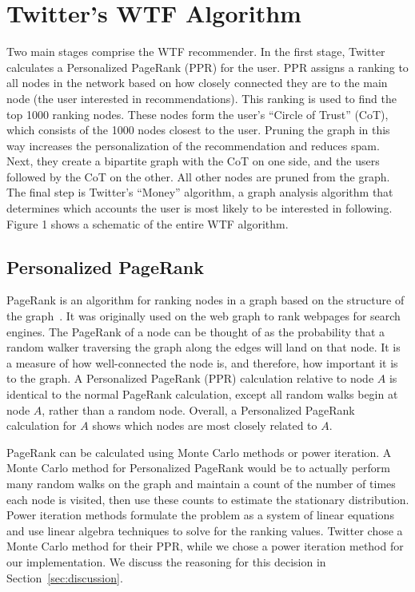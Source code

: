 \documentclass{article}
\renewcommand{\cite}[1]{}
\begin{document}
\section{Twitter's WTF Algorithm}

Two main stages comprise the WTF recommender. In the first stage, Twitter
calculates a Personalized PageRank (PPR) for the user. PPR assigns a
ranking to all nodes in the network based on how closely connected they are
to the main node (the user interested in recommendations). This ranking is
used to find the top 1000 ranking nodes. These nodes form the user's
``Circle of Trust'' (CoT), which consists of the 1000 nodes closest to the
user. Pruning the graph in this way increases the personalization of the
recommendation and reduces spam. Next, they create a bipartite graph with
the CoT on one side, and the users followed by the CoT on the other. All
other nodes are pruned from the graph. The final step is Twitter's
``Money'' algorithm, a graph analysis algorithm that determines which
accounts the user is most likely to be interested in following. Figure 1
shows a schematic of the entire WTF algorithm.

\subsection{Personalized PageRank}
PageRank is an algorithm for ranking nodes in a graph based on the
structure of the graph~\cite{Page:1999:TPC}. It was originally used on the
web graph to rank webpages for search engines. The PageRank of a node can
be thought of as the probability that a random walker traversing the graph
along the edges will land on that node. It is a measure of how
well-connected the node is, and therefore, how important it is to the
graph. A Personalized PageRank (PPR) calculation relative to node $A$ is
identical to the normal PageRank calculation, except all random walks begin
at node $A$, rather than a random node. Overall, a Personalized PageRank
calculation for $A$ shows which nodes are most closely related to $A$\@.

PageRank can be calculated using Monte Carlo methods or power iteration. A
Monte Carlo method for Personalized PageRank would be to actually perform
many random walks on the graph and maintain a count of the number of times
each node is visited, then use these counts to estimate the stationary
distribution. Power iteration methods formulate the problem as a system of
linear equations and use linear algebra techniques to solve for the ranking
values. Twitter chose a Monte Carlo method for their PPR, while we chose a
power iteration method for our implementation. We discuss the reasoning for
this decision in Section~\ref{sec:discussion}.
\end{document}
